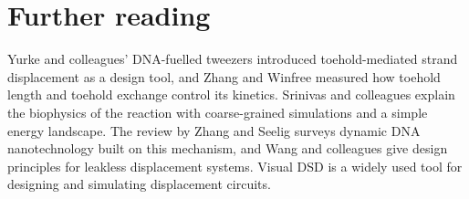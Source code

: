 \section*{Further reading}
Yurke and colleagues' DNA-fuelled tweezers introduced toehold-mediated strand
displacement as a design tool,\cite{Yurke2000} and Zhang and Winfree measured how
toehold length and toehold exchange control its kinetics.\cite{ZhangWinfree2009}
Srinivas and colleagues explain the biophysics of the reaction with coarse-grained
simulations and a simple energy landscape.\cite{Srinivas2013} The review by Zhang
and Seelig surveys dynamic DNA nanotechnology built on this
mechanism,\cite{ZhangSeelig2011} and Wang and colleagues give design principles
for leakless displacement systems.\cite{Wang2018} Visual DSD is a widely used tool
for designing and simulating displacement circuits.\cite{Lakin2011}
